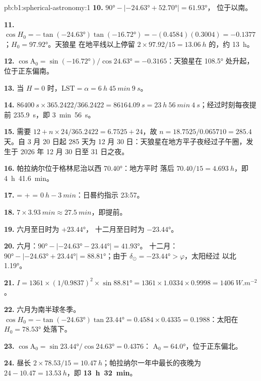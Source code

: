 \begin{solution}{pb:b1:spherical-astronomy:1}
\textbf{10.} $\ang{90} - |\ang{-24.63} + \ang{52.70}| = \ang{61.93}$，
位于以南。

\textbf{11.} $\cos H_0 = -\tan(\ang{-24.63})\tan(\ang{-16.72}) =
-(0.4584)(0.3004) = -0.1377$；$H_0 = \ang{97.92}$。天狼星
在地平线以上停留 $2\times97.92/15 = \qty{13.06}{h}$ 的，约 \qty{13}{h}。

\textbf{12.} $\cos\mathrm{A}_0 = \sin(\ang{-16.72})/\cos\ang{24.63} =
-0.3165$：天狼星在 \ang{108.5} 处升起，位于正东偏南。

\textbf{13.} 当 $H = 0$ 时，$\mathrm{LST} = \alpha = \qty{6}{h}~\qty{45}{min}~\qty{9}{s}$。

\textbf{14.} $\qty{86400}{s}\times365.2422/366.2422 = \qty{86164.09}{s} =
\qty{23}{h}~\qty{56}{min}~\qty{4}{s}$；经过时刻每夜提前
\qty{235.9}{s}，即 \qty{3}{min}~\qty{56}{s}。

\textbf{15.} 需要 $12 + n\times24/365.2422 = 6.7525 + 24$，故
$n = 18.7525/0.065710 = 285.4$ 天。自 3 月 20 日起 285 天为
12 月 30 日：天狼星在地方平子夜经过子午圈，发生于
2026 年 12 月 30 日至 31 日之夜。

\textbf{16.} 帕拉纳尔位于格林尼治以西 \ang{70.40}：地方平时
落后 $70.40/15 = \qty{4.693}{h}$，即 \qty{4}{h}~\qty{41.6}{min}。

\textbf{17.}  =  +  =
$\qty{0}{h} - \qty{3}{min}$：日晷约指示 23:57。

\textbf{18.} $7\times\qty{3.93}{min} \approx \qty{27.5}{min}$，即提前。

\textbf{19.} 六月至日时为 $+\ang{23.44}$，
十二月至日时为 $-\ang{23.44}$。

\textbf{20.} 六月：$\ang{90} - |\ang{-24.63} - \ang{23.44}| = \ang{41.93}$。
十二月：$\ang{90} - |\ang{-24.63} + \ang{23.44}| = \ang{88.81}$；由于
$\delta_\odot = \ang{-23.44} > \varphi$，太阳经过
以北 \ang{1.19}。

\textbf{21.} $I = 1361\times(1/0.9837)^2\times\sin\ang{88.81} = 1361\times
1.0334\times0.9998 = \qty{1406}{W.m^{-2}}$。

\textbf{22.} 六月为南半球冬季。$\cos H_0 = -\tan(\ang{-24.63})
\tan\ang{23.44} = 0.4584\times0.4335 = 0.1988$：太阳在
$H_0 = \ang{78.53}$ 处落下。

\textbf{23.} $\cos\mathrm{A}_0 = \sin\ang{23.44}/\cos\ang{24.63} = 0.4376$：
$\mathrm{A}_0 = \ang{64.0}$，位于正东偏北。

\textbf{24.} 昼长 $2\times78.53/15 = \qty{10.47}{h}$；帕拉纳尔一年中最长的夜晚为
$24 - 10.47 = \qty{13.53}{h}$，即
\textbf{\qty[text-series-to-math=true]{13}{h}~\qty[text-series-to-math=true]{32}{min}}。
\end{solution}
